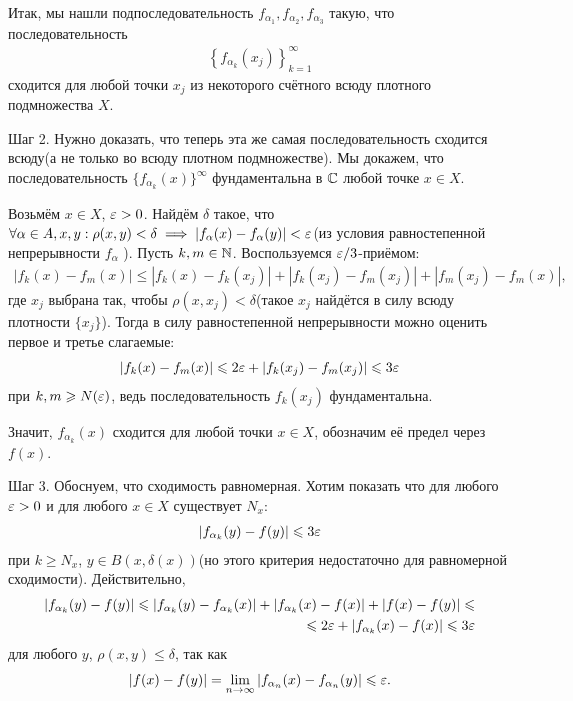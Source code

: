 \documentclass[../complex-analysis.tex]{subfiles}
\begin{document}
Итак, мы нашли подпоследовательность $ f_{\alpha_1}, f_{\alpha_2}, f_{\alpha_3} $ такую, что последовательность
\begin{align*}
 \left\{f_{\alpha_{k}}(x_j) \right\}_{k=1}^{\infty}
\end{align*} сходится для любой точки $ x_j $ из некоторого счётного всюду плотного подмножества $ X $.

Шаг 2. Нужно доказать, что теперь эта же самая последовательность сходится всюду(а не только во всюду плотном подмножестве). Мы докажем, что последовательность $ \{f_{\alpha_k}(x)\}_{}^{\infty}   $ фундаментальна в $ \mathbb{C} $ любой точке $ x \in X $.

Возьмём $ x \in X $, $ \varepsilon > 0 $. Найдём $ \delta $ такое, что $\forall \alpha \in A, x, y : \rho(x, y) < \delta \implies | f_\alpha(x) - f_\alpha(y)| < \varepsilon$(из условия равностепенной непрерывности $f_\alpha$ ). Пусть $ k, m \in \mathbb{N} $. Воспользуемся $ \varepsilon / 3 $-приёмом:
\begin{align*}
 \left| f_{k}(x) - f_{m}(x) \right|\leqslant \left| f_k(x) - f_k(x_j) \right| + \left| f_k(x_j) - f_m(x_j) \right| + \left| f_m(x_j) - f_m(x) \right|,
\end{align*} где $ x_j $ выбрана так, чтобы $ \rho(x, x_j) < \delta $(такое $x_j$ найдётся в силу всюду плотности $\{ x_j\}$). Тогда в силу равностепенной непрерывности можно оценить первое и третье слагаемые:
\begin{align*}
 \left| f_k(x)-f_m(x) \right| \leqslant 2\varepsilon + \left| f_k(x_j) - f_m(x_j) \right| \leqslant 3\varepsilon
\end{align*} при $ k, m \geqslant N(\varepsilon) $, ведь последовательность $ f_k(x_j) $ фундаментальна.

Значит, $ f_{\alpha_k}(x) $ сходится для любой точки $ x \in X $, обозначим её предел через $ f(x) $.

Шаг 3. Обоснуем, что сходимость равномерная. Хотим показать что для любого $ \varepsilon > 0 $ и для любого $ x \in X $ существует $ N_x $:
\begin{align*}
 \left|f_{\alpha_k}(y) - f(y) \right| \leqslant 3\varepsilon
\end{align*} при $ k \geqslant N_x $, $ y \in B(x, \delta(x)) $(но этого критерия недостаточно для равномерной сходимости). Действительно,
\begin{align*}
 \left| f_{\alpha_k}(y) - f(y) \right| \leqslant \left| f_{\alpha_k}(y) - f_{\alpha_k}(x) \right| + \left| f_{\alpha_k}(x) - f(x) \right| + \left| f(x) - f(y) \right| \leqslant \\ \leqslant 2\varepsilon + \left| f_{\alpha_k}(x) - f(x) \right| \leqslant 3\varepsilon
\end{align*}  для любого $ y $, $ \rho(x, y) \leqslant \delta $, так как
\begin{align*}
 \left| f(x) - f(y) \right| = \lim_{n \to \infty} \left|f_{\alpha_n}(x) - f_{\alpha_n}(y) \right| \leqslant \varepsilon.
\end{align*} 
\end{document}
